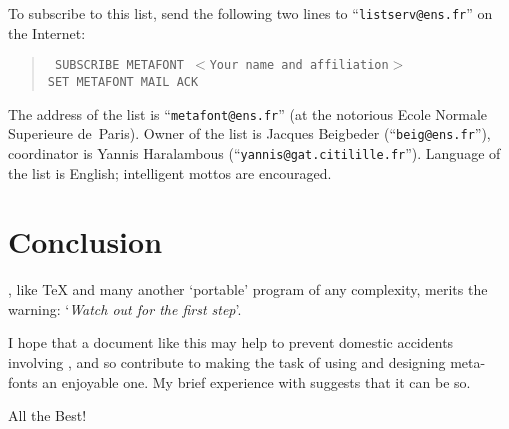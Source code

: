 To subscribe to this list, send the following two lines to
``{\tt listserv@ens.fr}'' on the Internet:
  \begin{quote}
    \tt
    SUBSCRIBE METAFONT $<$Your name and affiliation$>$\\
    SET METAFONT MAIL ACK
  \end{quote}
The address of the list is ``{\tt metafont@ens.fr}''
(at the notorious Ecole Normale Superieure de~Paris).
Owner of the list is Jacques {\sc Beigbeder}
(``{\tt beig@ens.fr}''),
coordinator is Yannis {\sc Haralambous}
(``{\tt yannis@gat.citilille.fr}'').
Language of the list is English;
intelligent mottos are encouraged.


\section{Conclusion}

\MF{}, like \TeX{} and many another `portable' program of any
complexity, merits the warning: `{\em Watch out for the first step\/}'.

I hope that a document like this may help to prevent domestic
accidents involving \MF{}, and so contribute to making the task
of using and designing meta-fonts an enjoyable one.  My brief
experience with \MF{} suggests that it can be so.


All the Best!


